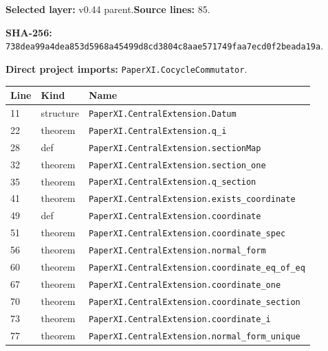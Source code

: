 \documentclass[10pt,oneside]{book}
\begin{document}
\textbf{Selected layer:} v0.44 parent.\quad\textbf{Source lines:} 85.\par\textbf{SHA-256:} {\scriptsize\nolinkurl{738dea99a4dea853d5968a45499d8cd3804c8aae571749faa7ecd0f2beada19a}}.


\textbf{Direct project imports:} \nolinkurl{PaperXI.CocycleCommutator}.

\begin{longtable}{@{}p{}p{}p{}@{}}\toprule Line&Kind&Name\\\midrule\endhead

11&structure&\nolinkurl{PaperXI.CentralExtension.Datum}\\

22&theorem&\nolinkurl{PaperXI.CentralExtension.q_i}\\

28&def&\nolinkurl{PaperXI.CentralExtension.sectionMap}\\

32&theorem&\nolinkurl{PaperXI.CentralExtension.section_one}\\

35&theorem&\nolinkurl{PaperXI.CentralExtension.q_section}\\

41&theorem&\nolinkurl{PaperXI.CentralExtension.exists_coordinate}\\

49&def&\nolinkurl{PaperXI.CentralExtension.coordinate}\\

51&theorem&\nolinkurl{PaperXI.CentralExtension.coordinate_spec}\\

56&theorem&\nolinkurl{PaperXI.CentralExtension.normal_form}\\

60&theorem&\nolinkurl{PaperXI.CentralExtension.coordinate_eq_of_eq}\\

67&theorem&\nolinkurl{PaperXI.CentralExtension.coordinate_one}\\

70&theorem&\nolinkurl{PaperXI.CentralExtension.coordinate_section}\\

73&theorem&\nolinkurl{PaperXI.CentralExtension.coordinate_i}\\

77&theorem&\nolinkurl{PaperXI.CentralExtension.normal_form_unique}\\

\bottomrule\end{longtable}
\end{document}
